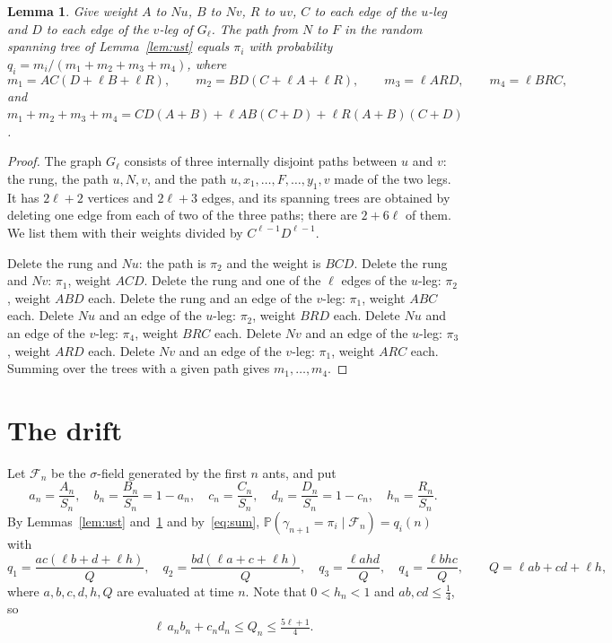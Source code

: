 \documentclass[11pt]{amsart}
\newtheorem{lemma}[theorem]{Lemma}
\theoremstyle{remark}
\newcommand{\PP}{\mathbb{P}}
\newcommand{\cF}{\mathcal{F}}
\begin{document}
\begin{lemma}\label{lem:law}
Give weight $A$ to $Nu$, $B$ to $Nv$, $R$ to $uv$, $C$ to each edge of the $u$-leg and $D$ to each edge of the $v$-leg
of $G_\ell$. The path from $N$ to $F$ in the random spanning tree of Lemma~\ref{lem:ust} equals $\pi_i$ with
probability $q_i=m_i/(m_1+m_2+m_3+m_4)$, where
\[
m_1=AC(D+\ell B+\ell R),\qquad m_2=BD(C+\ell A+\ell R),\qquad m_3=\ell ARD,\qquad m_4=\ell BRC,
\]
and $m_1+m_2+m_3+m_4=CD(A+B)+\ell AB(C+D)+\ell R(A+B)(C+D)$.
\end{lemma}
\begin{proof}
The graph $G_\ell$ consists of three internally disjoint paths between $u$ and $v$: the rung, the path $u,N,v$, and
the path $u,x_1,\dots,F,\dots,y_1,v$ made of the two legs. It has $2\ell+2$ vertices and $2\ell+3$ edges, and its
spanning trees are obtained by deleting one edge from each of two of the three paths; there are $2+6\ell$ of them. We
list them with their weights divided by $C^{\ell-1}D^{\ell-1}$.

Delete the rung and $Nu$: the path is $\pi_2$ and the weight is $BCD$. Delete the rung and $Nv$: $\pi_1$, weight $ACD$.
Delete the rung and one of the $\ell$ edges of the $u$-leg: $\pi_2$, weight $ABD$ each. Delete the rung and an edge of
the $v$-leg: $\pi_1$, weight $ABC$ each. Delete $Nu$ and an edge of the $u$-leg: $\pi_2$, weight $BRD$ each. Delete
$Nu$ and an edge of the $v$-leg: $\pi_4$, weight $BRC$ each. Delete $Nv$ and an edge of the $u$-leg: $\pi_3$, weight
$ARD$ each. Delete $Nv$ and an edge of the $v$-leg: $\pi_1$, weight $ARC$ each. Summing over the trees with a given
path gives $m_1,\dots,m_4$.
\end{proof}

\section{The drift}\label{sec:drift}

Let $\cF_n$ be the $\sigma$-field generated by the first $n$ ants, and put
\[
a_n=\frac{A_n}{S_n},\quad b_n=\frac{B_n}{S_n}=1-a_n,\quad c_n=\frac{C_n}{S_n},\quad d_n=\frac{D_n}{S_n}=1-c_n,
\quad h_n=\frac{R_n}{S_n} .
\]
By Lemmas~\ref{lem:ust} and~\ref{lem:law} and by~\eqref{eq:sum}, $\PP(\gamma_{n+1}=\pi_i\mid\cF_n)=q_i(n)$ with
\begin{equation}\label{eq:q}
q_1=\frac{ac(\ell b+d+\ell h)}{Q},\quad q_2=\frac{bd(\ell a+c+\ell h)}{Q},\quad q_3=\frac{\ell ahd}{Q},\quad
q_4=\frac{\ell bhc}{Q},\qquad Q=\ell ab+cd+\ell h,
\end{equation}
where $a,b,c,d,h,Q$ are evaluated at time $n$. Note that $0<h_n<1$ and $ab,cd\le\frac14$, so
\begin{equation}\label{eq:Qbound}
\ell\,a_nb_n+c_nd_n\le Q_n\le\tfrac{5\ell+1}{4} .
\end{equation}
\end{document}
